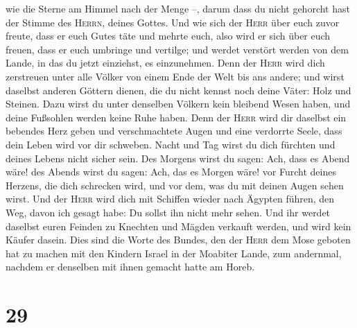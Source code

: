 wie die Sterne am Himmel nach der Menge --, darum dass du nicht gehorcht
hast der Stimme des \textsc{Herrn}, deines Gottes.  Und
wie sich der \textsc{Herr} über euch zuvor freute, dass er euch Gutes
täte und mehrte euch, also wird er sich über euch freuen, dass er euch
umbringe und vertilge; und werdet verstört werden von dem Lande, in das
du jetzt einziehst, es einzunehmen.  Denn der
\textsc{Herr} wird dich zerstreuen unter alle Völker von einem Ende der
Welt bis ans andere; und wirst daselbst anderen Göttern dienen, die du
nicht kennst noch deine Väter: Holz und Steinen.  Dazu
wirst du unter denselben Völkern kein bleibend Wesen haben, und deine
Fußsohlen werden keine Ruhe haben. Denn der \textsc{Herr} wird dir
daselbst ein bebendes Herz geben und verschmachtete Augen und eine
verdorrte Seele,  dass dein Leben wird vor dir schweben.
Nacht und Tag wirst du dich fürchten und deines Lebens nicht sicher
sein.  Des Morgens wirst du sagen: Ach, dass es Abend
wäre! des Abends wirst du sagen: Ach, das es Morgen wäre! vor Furcht
deines Herzens, die dich schrecken wird, und vor dem, was du mit deinen
Augen sehen wirst.  Und der \textsc{Herr} wird dich mit
Schiffen wieder nach Ägypten führen, den Weg, davon ich gesagt habe: Du
sollst ihn nicht mehr sehen. Und ihr werdet daselbst euren Feinden zu
Knechten und Mägden verkauft werden, und wird kein Käufer dasein.
 Dies sind die Worte des Bundes, den der \textsc{Herr}
dem Mose geboten hat zu machen mit den Kindern Israel in der Moabiter
Lande, zum andernmal, nachdem er denselben mit ihnen gemacht hatte am
Horeb.

\hypertarget{section-28}{%
\section{29}\label{section-28}}

